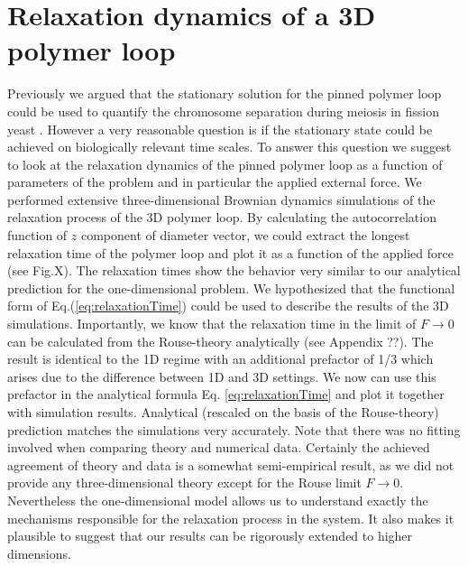 \documentclass[aps,showpacs,twocolumn,floatfix,prx,superscriptaddress]{revtex4-1}
\begin{document}
\section{Relaxation dynamics of a 3D polymer loop}
Previously we argued that the stationary solution for the pinned polymer loop could be used to quantify the chromosome separation during meiosis in fission yeast \cite{}. However a very reasonable question is if the stationary state could be achieved on biologically relevant time scales. To answer this question we suggest to look at the relaxation dynamics of the pinned polymer loop as a function of parameters of the problem and in particular the applied external force. We performed extensive three-dimensional Brownian dynamics simulations of the relaxation process of the 3D polymer loop. By calculating the autocorrelation function of $z$ component of diameter vector, we could extract the longest relaxation time of the polymer loop and plot it as a function of the applied force (see Fig.X). The relaxation times show the behavior very similar to our analytical prediction for the one-dimensional problem. We hypothesized that the functional form of Eq.(\ref{eq:relaxationTime}) could be used to describe the results of the 3D simulations. Importantly, we know that the relaxation time in the limit of $F\rightarrow 0$ can be calculated from the Rouse-theory analytically (see Appendix ??).  The result is identical to the 1D regime with an additional prefactor of 1/3 which arises due to the difference between 1D and 3D settings. We now can use this prefactor in the analytical formula Eq. \eqref{eq:relaxationTime} and plot it together with simulation results. Analytical (rescaled on the basis of the Rouse-theory) prediction matches the simulations very accurately. Note that there was no fitting involved when comparing theory and numerical data. Certainly the achieved agreement of theory and data is a somewhat semi-empirical result, as we did not provide any three-dimensional theory except for the Rouse limit $F\rightarrow 0$. Nevertheless the one-dimensional model allows us to understand exactly the mechanisms responsible for the relaxation process in the system. It also makes it plausible to suggest that our results can be rigorously extended to higher dimensions.
\end{document}
